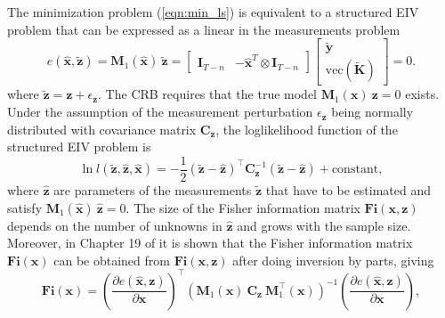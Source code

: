 The minimization problem (\ref{eqn:min_ls}) is equivalent to a structured EIV problem that can be expressed as a linear in the measurements problem \citep{Pintelon12Book}
\begin{equation} e (\widehat{\mathbf{x}}, \widetilde{\mathbf{z}}) = \mathbf{M}_1( \widehat{\mathbf{x}} ) \ \widetilde{\mathbf{z}} = \begin{bmatrix} \mathbf{I}_{T-n} & - \widehat{\mathbf{x}}^T \otimes \mathbf{I}_{T-n} \end{bmatrix} \begin{bmatrix} \widetilde{\mathbf{y}} \\ \mathrm{vec} ( \widetilde{\mathbf{K}} ) \end{bmatrix} = 0 . \label{eqn:M1vecyK} \end{equation}
where $\widetilde{\mathbf{z}} = \mathbf{z} + \epsilon_{\mathbf{z}}$.
The CRB requires that the true model $\mathbf{M}_1( \mathbf{x} ) \ \mathbf{z} = 0$ exists.
Under the assumption of the measurement perturbation $\epsilon_{\mathbf{z}}$ being normally distributed with covariance matrix $\mathbf{C}_{\mathbf{z}}$, the loglikelihood function of the structured EIV problem is
\begin{equation} \ln{ l(\widetilde{\mathbf{z}}, \widehat{\mathbf{z}}, \widehat{\mathbf{x}}) } = - \frac{1}{2} \left( \widetilde{\mathbf{z}} - \widehat{\mathbf{z}} \right)^\top \mathbf{C}_{\mathbf{z}}^{-1} \left( \widetilde{\mathbf{z}} - \widehat{\mathbf{z}} \right) + \mathrm{constant}, \end{equation}
where $\widehat{\mathbf{z}}$ are parameters of the measurements $\widetilde{\mathbf{z}}$ that have to be estimated and satisfy $\mathbf{M}_1( \widehat{\mathbf{x}} ) \ \widehat{\mathbf{z}} = 0$.
The size of the Fisher information matrix $\mathbf{Fi}(\mathbf{x}, \mathbf{z})$ depends on the number of unknowns in $\widehat{\mathbf{z}}$ and grows with the sample size.
Moreover, in Chapter 19 of \citep{Pintelon12Book} it is shown that the Fisher information matrix $\mathbf{Fi}(\mathbf{x})$ can be obtained from $\mathbf{Fi}(\mathbf{x}, \mathbf{z})$ after doing inversion by parts, giving
\begin{equation} \mathbf{Fi}(\mathbf{x}) = \left( \frac{\partial e (\widehat{\mathbf{x}}, \mathbf{z}) }{\partial \mathbf{x} } \right)^\top \left( \mathbf{M}_1( \mathbf{x} ) \ \mathbf{C}_{\mathbf{z}} \ \mathbf{M}_1^\top( \mathbf{x} ) \right)^{-1} \left( \frac{\partial e (\widehat{\mathbf{x}}, \mathbf{z}) }{\partial \mathbf{x} } \right) 
 , \label{eqn:FIM} \end{equation} 

